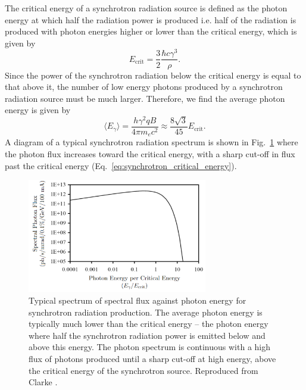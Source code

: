 \documentclass[../main.tex]{subfiles}
\begin{document}
The critical energy of a synchrotron radiation source is defined as the photon energy at which half the radiation power is produced i.e. half of the radiation is produced with photon energies higher or lower than the critical energy, which is given by
\begin{equation}
E_{\mathrm{crit}} = \frac{3}{2}\frac{\hbar c\gamma^{3}}{\rho}.
\label{eq:synchrotron_critical_energy}    
\end{equation}
Since the power of the synchrotron radiation below the critical energy is equal to that above it, the number of low energy photons produced by a synchrotron radiation source must be much larger. Therefore, we find the average photon energy is given by
\begin{equation}
\langle E_{\gamma} \rangle = \frac{h\gamma^{2}qB}{4\pi m_{e}c^{2}} \approx \frac{8\sqrt{3}}{45}E_{\mathrm{crit}}.
\label{eq:synchrotron_average_energy}    
\end{equation}
A diagram of a typical synchrotron radiation spectrum is shown in Fig.~\ref{fig:synchrotron_spectrum} where the photon flux increases toward the critical energy, with a sharp cut-off in flux past the critical energy (Eq.~\ref{eq:synchrotron_critical_energy}).
\begin{figure}[!h]
\centering
\includegraphics[width=0.7\textwidth]{Figures/Introduction/synchrotron_radiation_spectrum.pdf}
\caption{Typical spectrum of spectral flux against photon energy for synchrotron radiation production. The average photon energy is typically much lower than the critical energy -- the photon energy where half the synchrotron radiation power is emitted below and above this energy. The photon spectrum is continuous with a high flux of photons produced until a sharp cut-off at high energy, above the critical energy of the synchrotron source. Reproduced from Clarke \cite{clarke2016undulators}.}
\label{fig:synchrotron_spectrum}
\end{figure}
\end{document}
